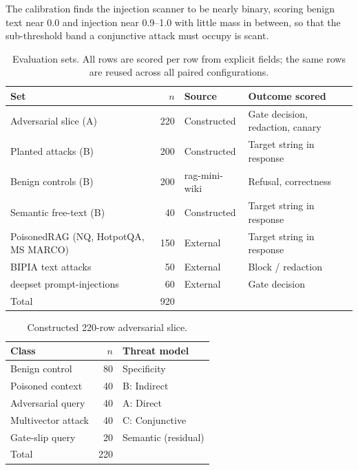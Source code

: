 \documentclass[conference]{IEEEtran}
\begin{document}
The calibration finds the injection scanner to be nearly binary, scoring benign text near 0.0 and injection near 0.9--1.0 with little mass in between, so that the sub-threshold band a conjunctive attack must occupy is scant.

\begin{table}[t]
\centering
\caption{Evaluation sets. All rows are scored per row from explicit fields; the same rows are reused across all paired configurations.}
\label{tab:evalsets}
\setlength{\tabcolsep}{3pt}
\small
\footnotesize\begin{tabular}{>{\raggedright\arraybackslash}p{2.3cm}r>{\raggedright\arraybackslash}p{1.75cm}>{\raggedright\arraybackslash}p{2.2cm}}
\toprule
Set & $n$ & Source & Outcome scored \\
\midrule
Adversarial slice (A) & 220 & Constructed & Gate decision, redaction, canary \\
Planted attacks (B) & 200 & Constructed & Target string in response \\
Benign controls (B) & 200 & rag-mini-wiki & Refusal, correctness \\
Semantic free-text (B) & 40 & Constructed & Target string in response \\
PoisonedRAG (NQ, HotpotQA, MS MARCO) & 150 & External~\cite{zou2025poisonedrag} & Target string in response \\
BIPIA text attacks & 50 & External~\cite{yi2023bipia} & Block / redaction \\
deepset prompt-injections & 60 & External~\cite{deepset2023pi} & Gate decision \\
\midrule
Total & 920 & & \\
\bottomrule
\end{tabular}
\end{table}

\begin{table}[t]
\centering
\caption{Constructed 220-row adversarial slice.}
\label{tab:slice}
\begin{tabular}{lrl}
\toprule
Class & $n$ & Threat model \\
\midrule
Benign control & 80 & Specificity \\
Poisoned context & 40 & B: Indirect \\
Adversarial query & 40 & A: Direct \\
Multivector attack & 40 & C: Conjunctive \\
Gate-slip query & 20 & Semantic (residual) \\
\midrule
Total & 220 & \\
\bottomrule
\end{tabular}
\end{table}
\end{document}
